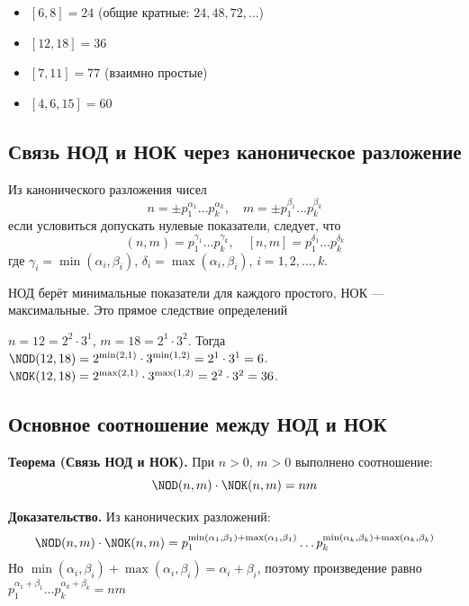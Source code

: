 \documentclass[a4paper,12pt]{article}
\theoremstyle{definition}
\theoremstyle{plain}
\theoremstyle{remark}
\begin{document}
	\begin{tcolorbox}[colback=gray!5, colframe=gray!50, title=Примеры]
	\begin{itemize}
	\item $[6, 8] = 24$ (общие кратные: $24, 48, 72, \dots$)
	\item $[12, 18] = 36$
	\item $[7, 11] = 77$ (взаимно простые)
	\item $[4, 6, 15] = 60$
	\end{itemize}
	\end{tcolorbox}
	
	\subsection{Связь НОД и НОК через каноническое разложение}
	
	Из канонического разложения чисел
	\[
	n = \pm p_1^{\alpha_1} \dots p_k^{\alpha_k}, \quad m = \pm p_1^{\beta_1} \dots p_k^{\beta_k}
	\]
	если условиться допускать нулевые показатели, следует, что
	\[
	(n, m) = p_1^{\gamma_1} \dots p_k^{\gamma_k}, \quad [n, m] = p_1^{\delta_1} \dots p_k^{\delta_k}
	\]
	где $\gamma_i = \min(\alpha_i, \beta_i)$, $\delta_i = \max(\alpha_i, \beta_i)$, $i = 1, 2, \dots, k$.
	
	\begin{tcolorbox}[colback=green!5, colframe=green!50!black, title=Пояснение]
	НОД берёт минимальные показатели для каждого простого, НОК — максимальные. Это прямое следствие определений
	\end{tcolorbox}
	
	\begin{tcolorbox}[colback=gray!5, colframe=gray!50, title=Пример]
	$n = 12 = 2^2 \cdot 3^1$, $m = 18 = 2^1 \cdot 3^2$.
	Тогда $\NOD(12,18) = 2^{\min(2,1)} \cdot 3^{\min(1,2)} = 2^1 \cdot 3^1 = 6$.
	$\NOK(12,18) = 2^{\max(2,1)} \cdot 3^{\max(1,2)} = 2^2 \cdot 3^2 = 36$.
	\end{tcolorbox}
	
	\subsection{Основное соотношение между НОД и НОК}
	
	\noindent \textbf{Теорема (Связь НОД и НОК).}
	При $n > 0$, $m > 0$ выполнено соотношение:
	\[
	\NOD(n, m) \cdot \NOK(n, m) = n m
	\]
	
	\medskip
	\noindent \textbf{Доказательство.}
	Из канонических разложений:
	\[
	\NOD(n, m) \cdot \NOK(n, m) = p_1^{\min(\alpha_1,\beta_1) + \max(\alpha_1,\beta_1)} \dots p_k^{\min(\alpha_k,\beta_k) + \max(\alpha_k,\beta_k)}
	\]
	Но $\min(\alpha_i, \beta_i) + \max(\alpha_i, \beta_i) = \alpha_i + \beta_i$, поэтому произведение равно $p_1^{\alpha_1+\beta_1} \dots p_k^{\alpha_k+\beta_k} = n m$
	
\end{document}
